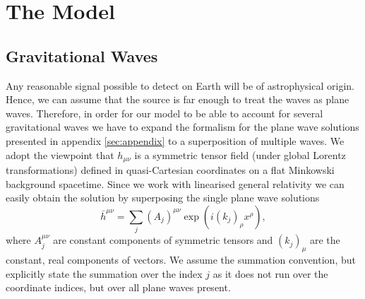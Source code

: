 \section{The Model}\label{sec:model}

\subsection{Gravitational Waves}

Any reasonable signal possible to detect on Earth will be of
astrophysical origin. Hence, we can assume that the source is far
enough to treat the waves as plane waves. Therefore, in order for our
model to be able to account for several gravitational waves we have to
expand the formalism for the plane wave solutions presented in
appendix \ref{sec:appendix} to a superposition of multiple waves. We
adopt the viewpoint that $h_{\mu\nu}$ is a symmetric tensor field
(under global Lorentz transformations) defined in quasi-Cartesian
coordinates on a flat Minkowski background spacetime. Since we work
with linearised general relativity we can easily obtain the solution
by superposing the single plane wave solutions
\begin{equation}\label{eq:manywaves}
\bar{h}^{\mu\nu} = \sum_j(A_j)^{\mu\nu}\exp(i(k_j)_\rho x^\rho),
\end{equation}
where $A_j^{\mu\nu}$ are constant components of symmetric tensors and
$(k_j)_\mu$ are the constant, real components of vectors. We assume the
summation convention, but explicitly state the summation over the
index $j$ as it does not run over the coordinate indices, but over all
plane waves present.

